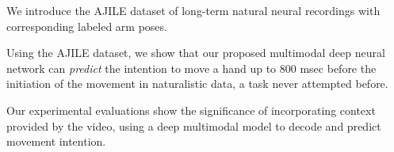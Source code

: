\documentclass[letterpaper]{article} %
\begin{document}
\begin{compactitem}
\item We introduce the AJILE dataset of long-term natural neural recordings with corresponding labeled arm poses.

\item Using the AJILE dataset, we show that our proposed multimodal deep neural network can \emph{predict} the intention to move a hand up to 800 msec before the initiation of the movement in naturalistic data, a task never attempted before.


\item Our experimental evaluations show the significance of incorporating context provided by the video, using a deep multimodal model to decode and predict movement intention. 





\end{compactitem}
\end{document}
